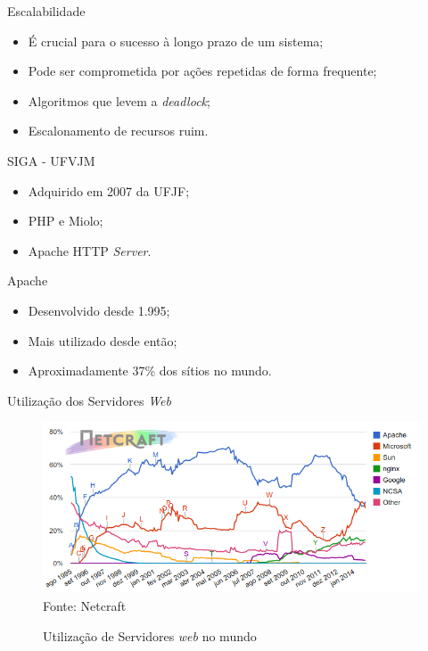 \begin{frame}{Escalabilidade}
	\begin{block}{}
		\begin{itemize}
			\item É crucial para o sucesso à longo prazo de um sistema; \pause
			\item Pode ser comprometida por ações repetidas de forma frequente; 
			\pause
			\item Algoritmos que levem a \textit{deadlock}; \pause
			\item Escalonamento de recursos ruim.
		\end{itemize}
	\end{block}
\end{frame}
\begin{frame}
	\begin{block}{SIGA - UFVJM}
		\begin{itemize}
			\item Adquirido em 2007 da UFJF; \pause
			\item PHP e Miolo; \pause
			\item Apache HTTP \textit{Server}.
		\end{itemize}
	\end{block} \pause
	\begin{block}{Apache}
		\begin{itemize}
			\item Desenvolvido desde 1.995;
			\item Mais utilizado desde então;
			\item Aproximadamente 37\% dos sítios no mundo.
		\end{itemize}
	\end{block}
\end{frame}
\begin{frame}{Utilização dos Servidores \textit{Web}}
	\begin{figure}
		\centering
		\caption{Utilização de Servidores \textit{web} no mundo}
		\includegraphics[width=1\linewidth]{../figuras/grafico1}\\
		Fonte: Netcraft
	\end{figure}
\end{frame}
